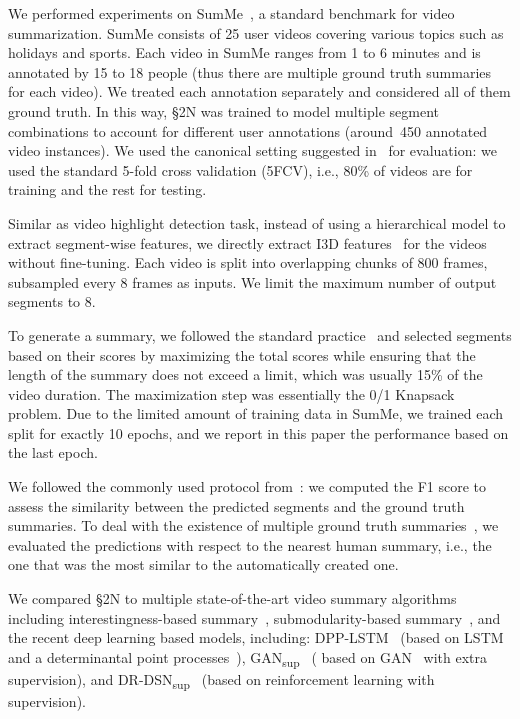 \documentclass[10pt,journal,compsoc]{IEEEtran}
\begin{document}
 We performed experiments on SumMe~\cite{gygli2014creating}, a standard benchmark for video summarization. SumMe consists of 25 user videos covering various topics such as holidays and sports. Each video in SumMe ranges from 1 to 6 minutes and is annotated by 15 to 18 people (thus there are multiple ground truth summaries for each video). We treated each annotation separately and considered all of them ground truth. In this way, \S2N was trained to model multiple segment combinations to account for different user annotations (around~450 annotated video instances). We used the  canonical setting suggested in~\cite{zhang2016video} for evaluation: we used the standard 5-fold cross validation (5FCV), i.e., 80\% of videos are for training and the rest for testing.


 Similar as video highlight detection task, instead of using a hierarchical model to extract segment-wise features, we directly extract I3D features~\cite{carreira2017quo} for the videos without fine-tuning.  Each video is split into overlapping chunks of 800 frames, subsampled every 8 frames as inputs. We limit the maximum number of output segments to 8. %

To generate a summary, we followed the standard practice~\cite{zhang2016video, zhou2017deep} and 
selected segments based on their scores by maximizing the total scores while ensuring that the length of the summary does not exceed a limit, which was usually 15\% of the video duration. The maximization step was essentially the 0/1 Knapsack problem. Due to the limited amount of training data in SumMe, we trained each split for exactly 10 epochs, and we report in this paper the performance based on the last epoch. 


 We followed the commonly used protocol from~\cite{zhang2016video,zhou2017deep,gygli2015video}: we computed the F1 score to assess the similarity between the predicted segments and the ground truth summaries. To deal with the existence of multiple ground truth summaries~\cite{gygli2015video}, we evaluated the predictions with respect to the nearest human summary, i.e., the one that was the most similar to the automatically created one. 



 We compared \S2N to multiple state-of-the-art video summary algorithms including interestingness-based summary~\cite{gygli2014creating}, submodularity-based summary~\cite{gygli2015video}, and the recent deep learning based models,  including:  DPP-LSTM~\cite{zhang2016video} (based on LSTM and a determinantal point processes~\cite{gong2014diverse}), GAN\textsubscript{sup}~\cite{mahasseni2017unsupervised} ( based on GAN~\cite{goodfellow2014generative} with extra supervision),  and DR-DSN\textsubscript{sup}~\cite{zhou2017deep} (based on reinforcement learning with supervision). 
\end{document}
